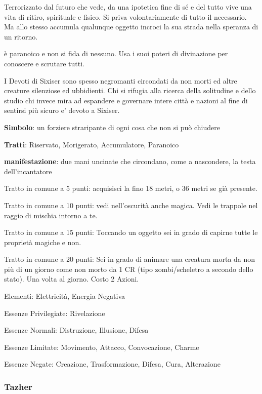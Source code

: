 \documentclass[a4paper,11pt,twoside,openany]{book}
\begin{document}
{Terrorizzato dal futuro che vede, da una ipotetica fine di sé e del tutto vive una vita di ritiro, spirituale e fisico. Si priva volontariamente di tutto il necessario. Ma allo stesso accumula qualunque oggetto incroci la sua strada nella speranza di un ritorno.

è paranoico e non si fida di nessuno. Usa i suoi poteri di divinazione per conoscere e scrutare tutti.

I Devoti di Sixiser sono spesso negromanti circondati da non morti ed altre creature silenziose ed ubbidienti. Chi si rifugia alla ricerca della solitudine e dello studio chi invece mira ad espandere e governare intere città e nazioni al fine di sentirsi più sicuro e' devoto a Sixiser.

\textbf{Simbolo}: un forziere straripante di ogni cosa che non si può chiudere

\textbf{Tratti}: Riservato, Morigerato, Accumulatore, Paranoico

\textbf{manifestazione}: due mani uncinate che circondano, come a nascondere, la testa dell'incantatore

\bigskip

Tratto in comune a 5 punti: acquisisci la fino 18 metri, o 36 metri se già presente.

Tratto in comune a 10 punti: vedi nell'oscurità anche magica. Vedi le trappole nel raggio di mischia intorno a te.

Tratto in comune a 15 punti: Toccando un oggetto sei in grado di capirne tutte le proprietà magiche e non.

Tratto in comune a 20 punti: Sei in grado di animare una creatura morta da non più di un giorno come non morto da 1 CR (tipo zombi/scheletro a secondo dello stato). Una volta al giorno. Costo 2 Azioni.

\bigskip

Elementi: Elettricità, Energia Negativa

\bigskip

Essenze Privilegiate: Rivelazione

Essenze Normali: Distruzione, Illusione, Difesa

Essenze Limitate: Movimento, Attacco, Convocazione, Charme

Essenze Negate: Creazione, Trasformazione, Difesa, Cura, Alterazione

\subsubsection{Tazher}

}
\end{document}
